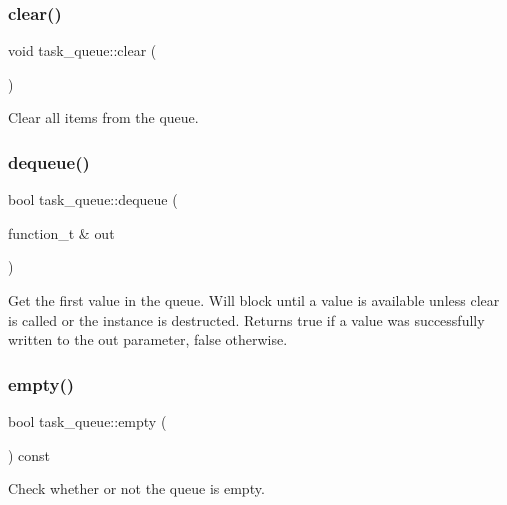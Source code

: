 \subsubsection{\texorpdfstring{clear()}{clear()}}
{\footnotesize\ttfamily void task\+\_\+queue\+::clear (\begin{DoxyParamCaption}{ }\end{DoxyParamCaption})\hspace{0.3cm}{\ttfamily [inline]}}

Clear all items from the queue. \mbox{\label{classtask__queue_a8febb9f611ff31bc105027c7d90784a6}} 
\subsubsection{\texorpdfstring{dequeue()}{dequeue()}}
{\footnotesize\ttfamily bool task\+\_\+queue\+::dequeue (\begin{DoxyParamCaption}\item[{function\+\_\+t \&}]{out }\end{DoxyParamCaption})\hspace{0.3cm}{\ttfamily [inline]}}

Get the first value in the queue. Will block until a value is available unless clear is called or the instance is destructed. Returns true if a value was successfully written to the out parameter, false otherwise. \mbox{\label{classtask__queue_a124dd18ea98e42ae705f7835fd0c69cf}} 
\subsubsection{\texorpdfstring{empty()}{empty()}}
{\footnotesize\ttfamily bool task\+\_\+queue\+::empty (\begin{DoxyParamCaption}{ }\end{DoxyParamCaption}) const\hspace{0.3cm}{\ttfamily [inline]}}

Check whether or not the queue is empty. \mbox{\label{classtask__queue_ac9fce851e5f4eecd014ef0130f0db4bc}} 
